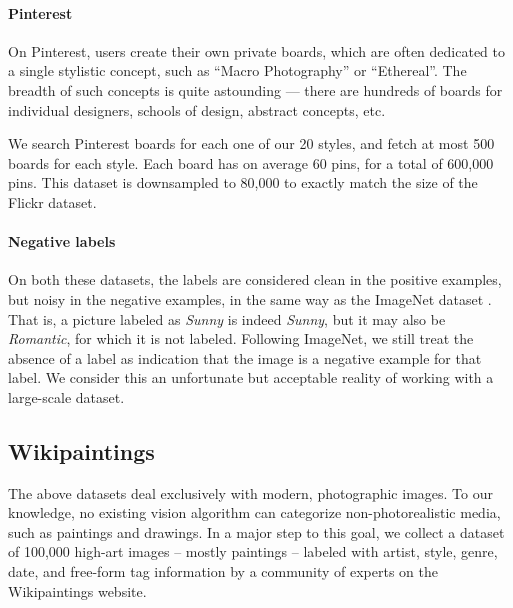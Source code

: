 

\paragraph{Pinterest}
On Pinterest, users create their own private boards, which are often dedicated to a single stylistic concept, such as ``Macro Photography'' or ``Ethereal''.
The breadth of such concepts is quite astounding --- there are hundreds of boards for individual designers, schools of design, abstract concepts, etc.

We search Pinterest boards for each one of our 20 styles, and fetch at most 500 boards for each style.
Each board has on average 60 pins, for a total of 600,000 pins.
This dataset is downsampled to 80,000 to exactly match the size of the Flickr dataset.

\paragraph{Negative labels}
On both these datasets, the labels are considered clean in the positive examples, but noisy in the negative examples, in the same way as the ImageNet dataset \cite{Deng-CVPR-2009}.
That is, a picture labeled as \emph{Sunny} is indeed \emph{Sunny}, but it may also be \emph{Romantic}, for which it is not labeled.
Following ImageNet, we still treat the absence of a label as indication that the image is a negative example for that label.
We consider this an unfortunate but acceptable reality of working with a large-scale dataset.


\subsection{Wikipaintings}
The above datasets deal exclusively with modern, photographic images.
To our knowledge, no existing vision algorithm can categorize non-photorealistic media, such as paintings and drawings.
In a major step to this goal, we collect a dataset of 100,000 high-art images -- mostly paintings -- labeled with artist, style, genre, date, and free-form tag information by a community of experts on the Wikipaintings website.

%

